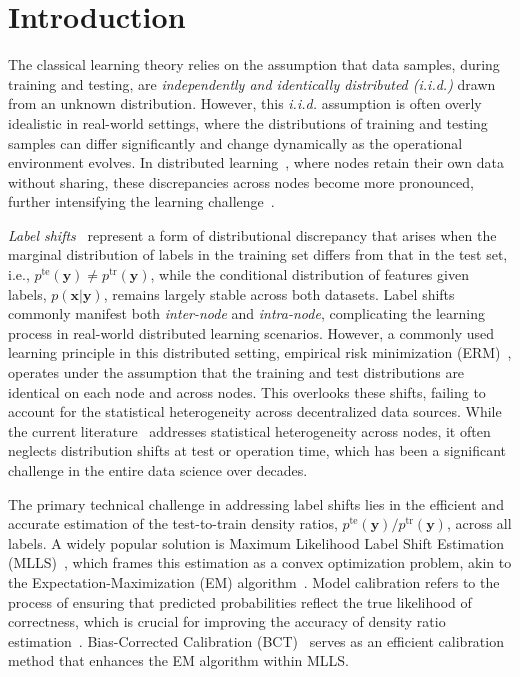 \section{Introduction}\label{sec:intro}

The classical learning theory relies on the assumption that data samples, during training and testing, are {\it independently and identically distributed (i.i.d.)} drawn from an unknown distribution. However, this {\it i.i.d.} assumption is often overly idealistic in real-world settings, where the distributions of training and testing samples can differ significantly and change dynamically as the operational environment evolves. 
In distributed learning~\citep{pmlr-v162-kim22a, wen2023survey, ye2023heterogeneous, 10203330}, where nodes retain their own data without sharing, these discrepancies across nodes become more pronounced, further intensifying the learning challenge~\citep{rahman2023federated, wang2023flexifed}.

{\it Label shifts}~\citep{bbse, garg2022OSLS, mani2022unsupervised, zhou2023domain} represent a form of distributional discrepancy that arises when the marginal distribution of labels in the training set differs from that in the test set, i.e., $p^{\text{te}}(\boldsymbol{y}) \neq p^{\text{tr}}(\boldsymbol{y})$, while the conditional distribution of features given labels, $p(\boldsymbol{x}|\boldsymbol{y})$, remains largely stable across both datasets.
Label shifts commonly manifest both \textit{inter-node} and \textit{intra-node}, complicating the learning process in real-world distributed learning scenarios. However, a commonly used learning principle in this distributed setting, empirical risk minimization (ERM)~\citep{10.5555/3666122.3667754}, operates under the assumption that the training and test distributions are identical on each node and across nodes. This overlooks these shifts, failing to account for the statistical heterogeneity across decentralized data sources.
While the current literature~\citep{yin2024optimization} addresses statistical heterogeneity across nodes, it often neglects distribution shifts at test or operation time, which has been a significant challenge in the entire data science over decades.

The primary technical challenge in addressing label shifts lies in the efficient and accurate estimation of the test-to-train density ratios, $p^{\text{te}}(\boldsymbol{y}) / p^{\text{tr}}(\boldsymbol{y}) $, across all labels.
A widely popular solution is Maximum Likelihood Label Shift Estimation (MLLS)~\citep{mlls}, which frames this estimation as a convex optimization problem, akin to the Expectation-Maximization (EM) algorithm~\citep{bbse_2002}. Model calibration refers to the process of ensuring that predicted probabilities reflect the true likelihood of correctness, which is crucial for improving the accuracy of density ratio estimation~\citep{calibration_modern, mlls}.
Bias-Corrected Calibration (BCT)~\citep{AlexandariEM} serves as an efficient calibration method that enhances the EM algorithm within MLLS. 

